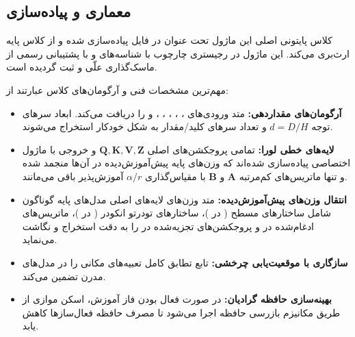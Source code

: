 \subsection{معماری و پیاده‌سازی}
کلاس پایتونی اصلی این ماژول تحت عنوان  در فایل  پیاده‌سازی شده و از کلاس پایه  ارث‌بری می‌کند. این ماژول در رجیستری چارچوب با شناسه‌های  و  با پشتیبانی رسمی از ماسک‌گذاری علّی و  ثبت گردیده است.

مهم‌ترین مشخصات فنی و آرگومان‌های کلاس عبارتند از:
\begin{itemize}
    \item \textbf{آرگومان‌های مقداردهی:} متد  ورودی‌های ، ، ، ، ،  و  را دریافت می‌کند. ابعاد سرهای توجه $d = D/H$ و تعداد سرهای کلید/مقدار به شکل خودکار استخراج می‌شوند.
    \item \textbf{لایه‌های خطی لورا:} تمامی پروجکشن‌های اصلی $\mathbf{Q}, \mathbf{K}, \mathbf{V}, \mathbf{Z}$ و خروجی با ماژول اختصاصی  پیاده‌سازی شده‌اند که وزن‌های پایه پیش‌آموزش‌دیده در آن‌ها منجمد  شده و تنها ماتریس‌های کم‌مرتبه $\mathbf{A}$ و $\mathbf{B}$ با مقیاس‌گذاری $\alpha / r$ آموزش‌پذیر باقی می‌مانند.
    \item \textbf{انتقال وزن‌های پیش‌آموزش‌دیده:} متد  وزن‌های لایه‌های اصلی مدل‌های پایه گوناگون شامل ساختارهای مسطح ( در )، ساختارهای تودرتو انکودر ( در )، ماتریس‌های ادغام‌شده  در  و پروجکشن‌های تجزیه‌شده  در  را به دقت استخراج و نگاشت می‌نماید.
    \item \textbf{سازگاری با موقعیت‌یابی چرخشی:} تابع  تطابق کامل تعبیه‌های مکانی  را در مدل‌های مدرن تضمین می‌کند.
    \item \textbf{بهینه‌سازی حافظه گرادیان:} در صورت فعال بودن فاز آموزش، اسکن موازی  از طریق مکانیزم بازرسی حافظه  اجرا می‌شود تا مصرف حافظه فعال‌سازها کاهش یابد.
\end{itemize}
